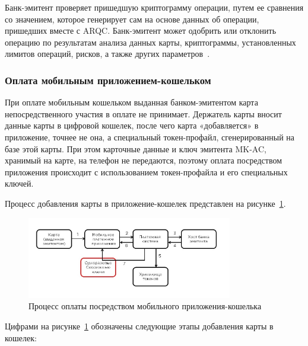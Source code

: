 Банк-эмитент проверяет пришедшую криптограмму операции, путем ее сравнения со значением, которое генерирует сам на основе данных об операции, пришедших вместе с ARQC.
Банк-эмитент может одобрить или отклонить операцию по результатам анализа данных карты, криптограммы, установленных лимитов операций, рисков, а также других параметров~\cite{habr_nspk_mir_payment}.

\subsubsection{Оплата мобильным приложением-кошельком}

При оплате мобильным кошельком выданная банком-эмитентом карта непосредственного участия в оплате не принимает.
Держатель карты вносит данные карты в цифровой кошелек, после чего карта «добавляется» в приложение, точнее не она, а специальный токен-профайл, сгенерированный на базе этой карты.
При этом карточные данные и ключ эмитента MK-AC, хранимый на карте, на телефон не передаются, поэтому оплата посредством приложения происходит с использованием токен-профайла и его специальных ключей.

Процесс добавления карты в приложение-кошелек представлен на рисунке~\ref{fig:add_mob_cardholder}.

\begin{figure}[H]
    \centering
    \includegraphics[width=0.8\textwidth]{images/research/add_mob_cardholder}
    \caption{\centering Процесс оплаты посредством мобильного приложения-кошелька}
    \label{fig:add_mob_cardholder}
\end{figure}

Цифрами на рисунке~\ref{fig:add_mob_cardholder} обозначены следующие этапы добавления карты в кошелек:

